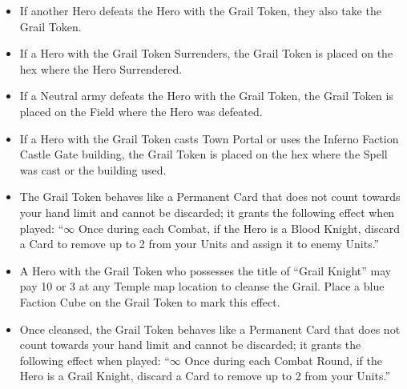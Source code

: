 \begin{multicols*}{2}
\begin{itemize}
  \item If another Hero defeats the Hero with the Grail Token, they also take the Grail Token.
  \item If a Hero with the Grail Token Surrenders, the Grail Token is placed on the hex where the Hero Surrendered.
  \item If a Neutral army defeats the Hero with the Grail Token, the Grail Token is placed on the Field where the Hero was defeated.
  \item If a Hero with the Grail Token casts Town Portal or uses the Inferno Faction Castle Gate building, the Grail Token is placed on the hex where the Spell was cast or the building used.
  \item The Grail Token behaves like a Permanent Card that does not count towards your hand limit and cannot be discarded; it grants the following effect when played: ``$\infty$ Once during each Combat, if the Hero is a \textcolor{darkcandyapplered}{Blood Knight}, discard a Card to remove up to 2  from your Units and assign it to enemy Units.''
  \item A Hero with the Grail Token who possesses the title of ``\textcolor{cobalt}{Grail Knight}'' may pay 10  or 3  at any Temple map location to cleanse the Grail. Place a blue Faction Cube on the Grail Token to mark this effect.
  \item Once cleansed, the Grail Token behaves like a Permanent Card that does not count towards your hand limit and cannot be discarded; it grants the following effect when played: ``$\infty$ Once during each Combat Round, if the Hero is a \textcolor{cobalt}{Grail Knight}, discard a Card to remove up to 2  from your Units.''
\end{itemize}

\vspace*{\fill}

\begin{center}
\end{center}

\vspace*{\fill}

\end{multicols*}

